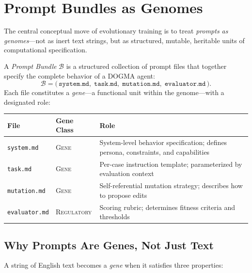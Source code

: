 \section{Prompt Bundles as Genomes}
\label{sec:prompt-genomes}

The central conceptual move of evolutionary training is to treat \emph{prompts as genomes}---not as inert text strings, but as structured, mutable, heritable units of computational specification.

\begin{dogmadef}
A \emph{Prompt Bundle} $\mathcal{B}$ is a structured collection of prompt files that together specify the complete behavior of a DOGMA agent:
\begin{equation}
\mathcal{B} = \bigl(\, \texttt{system.md},\; \texttt{task.md},\; \texttt{mutation.md},\; \texttt{evaluator.md} \,\bigr).
\end{equation}
Each file constitutes a \emph{gene}---a functional unit within the genome---with a designated role:
\begin{center}
\renewcommand{\arraystretch}{1.15}
\begin{tabularx}{0.92\textwidth}{l l Y}
\toprule
\textbf{File} & \textbf{Gene Class} & \textbf{Role} \\
\midrule
\texttt{system.md} & \textsc{Gene} & System-level behavior specification; defines persona, constraints, and capabilities \\
\texttt{task.md} & \textsc{Gene} & Per-case instruction template; parameterized by evaluation context \\
\texttt{mutation.md} & \textsc{Gene} & Self-referential mutation strategy; describes how to propose edits \\
\texttt{evaluator.md} & \textsc{Regulatory} & Scoring rubric; determines fitness criteria and thresholds \\
\bottomrule
\end{tabularx}
\end{center}
\end{dogmadef}

\subsection{Why Prompts Are Genes, Not Just Text}

A string of English text becomes a \emph{gene} when it satisfies three properties:

